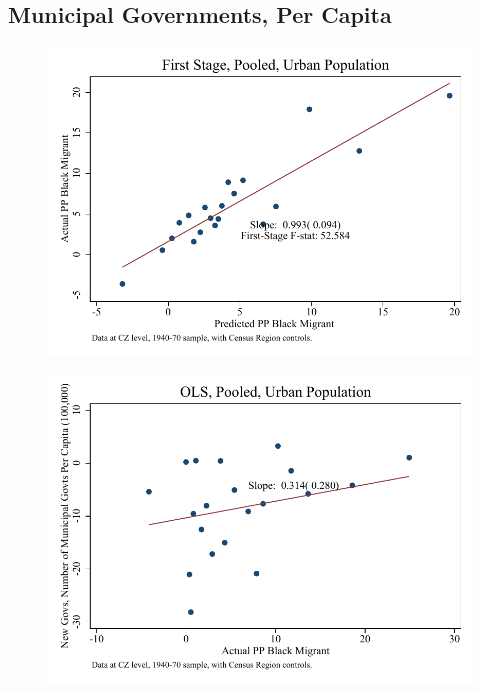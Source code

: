 \documentclass{article}
\begin{document}
\subsection{Municipal Governments, Per Capita}

\clearpage
\begin{figure}
\centering
\includegraphics{figures/simplefigs/pooled_gen_muni_pc_C3_urban_fs.pdf}
\end{figure}
\clearpage
\begin{figure}
\centering
\includegraphics{figures/simplefigs/pooled_gen_muni_pc_C3_urban_ols.pdf}
\end{figure}
\clearpage
\end{document}
